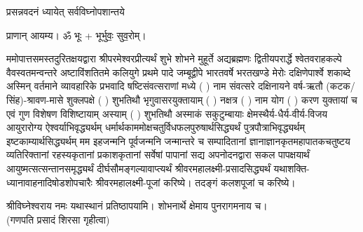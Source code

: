 
\setlength{\parindent}{0pt}


 

{प्रसन्नवदनं ध्यायेत् सर्वविघ्नोपशान्तये}
 
प्राणान्  आयम्य।  ॐ भूः + भूर्भुवः॒ सुव॒रोम्।


ममोपात्तसमस्तदुरितक्षयद्वारा श्रीपरमेश्वरप्रीत्यर्थं शुभे शोभने मुहूर्ते अद्यब्रह्मणः
द्वितीयपरार्द्धे श्वेतवराहकल्पे वैवस्वतमन्वन्तरे अष्टाविंशतितमे कलियुगे प्रथमे पादे
जम्बूद्वीपे भारतवर्षे भरतखण्डे मेरोः दक्षिणेपार्श्वे शकाब्दे अस्मिन् वर्तमाने व्यावहारिके
 प्रभवादि षष्टिसंवत्सराणां मध्ये (  ) नाम संवत्सरे दक्षिनायने 
वर्ष-ऋतौ (कटक/सिंह)-श्रावण-मासे शुक्लपक्षे ( ) शुभतिथौ भृगुवासरयुक्तायाम्
(  ) नक्षत्र (  ) नाम  योग  ( ) करण युक्तायां च एवं गुण विशेषण विशिष्टायाम्
अस्याम् ( ) शुभतिथौ 
अस्माकं सकुटुम्बायाः क्षेमस्थैर्य-धैर्य-वीर्य-विजय आयुरारोग्य ऐश्वर्याभिवृद्ध्यर्थम्
 धर्मार्थकाममोक्ष\-चतुर्विधफलपुरुषार्थसिद्ध्यर्थं पुत्रपौत्राभि\-वृद्ध्यर्थम् इष्टकाम्यार्थसिद्ध्यर्थम्
मम इहजन्मनि पूर्वजन्मनि जन्मान्तरे च सम्पादितानां ज्ञानाज्ञानकृतमहा\-पातकचतुष्टय
व्यतिरिक्तानां रहस्यकृतानां प्रकाशकृतानां सर्वेषां पापानां सद्य अपनोदनद्वारा सकल 
पापक्षयार्थं आयुष्मत्सत्सन्तानसमृद्ध्यर्थं दीर्घसौमङ्गल्यावाप्त्यर्थं
श्रीवरमहालक्ष्मी-प्रसादसिद्ध्यर्थं 
यथाशक्ति-ध्यानावाहनादिषोडशोपचारैः 
श्रीवरमहालक्ष्मी-पूजां करिष्ये। तदङ्गं कलशपूजां च करिष्ये। 


श्रीविघ्नेश्वराय नमः यथास्थानं प्रतिष्ठापयामि। शोभनार्थे क्षेमाय पुनरागमनाय च।\\
(गणपति प्रसादं शिरसा गृहीत्वा)













